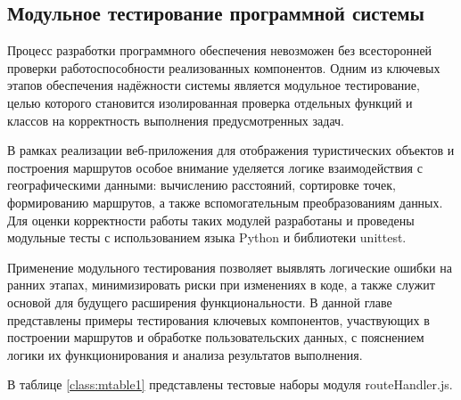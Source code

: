 \subsection{Модульное тестирование программной системы}

Процесс разработки программного обеспечения невозможен без всесторонней проверки работоспособности реализованных компонентов. Одним из ключевых этапов обеспечения надёжности системы является модульное тестирование, целью которого становится изолированная проверка отдельных функций и классов на корректность выполнения предусмотренных задач.

В рамках реализации веб-приложения для отображения туристических объектов и построения маршрутов особое внимание уделяется логике взаимодействия с географическими данными: вычислению расстояний, сортировке точек, формированию маршрутов, а также вспомогательным преобразованиям данных. Для оценки корректности работы таких модулей разработаны и проведены модульные тесты с использованием языка Python и библиотеки unittest.

Применение модульного тестирования позволяет выявлять логические ошибки на ранних этапах, минимизировать риски при изменениях в коде, а также служит основой для будущего расширения функциональности. В данной главе представлены примеры тестирования ключевых компонентов, участвующих в построении маршрутов и обработке пользовательских данных, с пояснением логики их функционирования и анализа результатов выполнения.

В таблице \ref{class:mtable1} представлены тестовые наборы модуля routeHandler.js.


